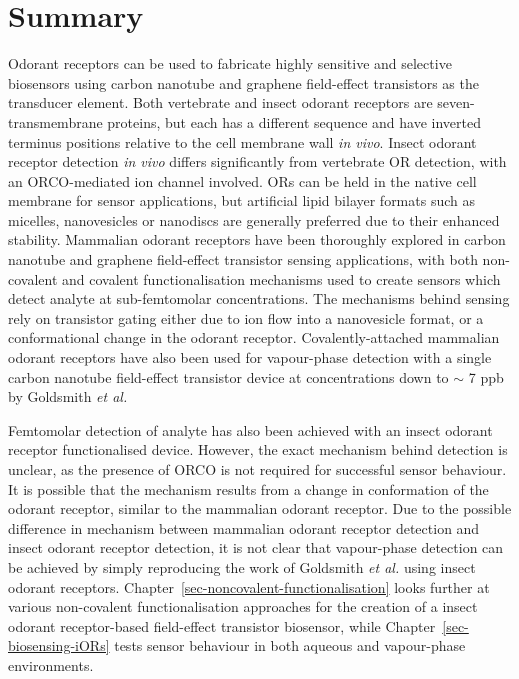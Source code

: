\documentclass[
  a4paper,
]{scrbook}
\begin{document}
\hypertarget{summary-1}{%
\section{Summary}\label{summary-1}}

Odorant receptors can be used to fabricate highly sensitive and
selective biosensors using carbon nanotube and graphene field-effect
transistors as the transducer element. Both vertebrate and insect
odorant receptors are seven-transmembrane proteins, but each has a
different sequence and have inverted terminus positions relative to the
cell membrane wall \emph{in vivo}. Insect odorant receptor detection
\emph{in vivo} differs significantly from vertebrate OR detection, with
an ORCO-mediated ion channel involved. ORs can be held in the native
cell membrane for sensor applications, but artificial lipid bilayer
formats such as micelles, nanovesicles or nanodiscs are generally
preferred due to their enhanced stability. Mammalian odorant receptors
have been thoroughly explored in carbon nanotube and graphene
field-effect transistor sensing applications, with both non-covalent and
covalent functionalisation mechanisms used to create sensors which
detect analyte at sub-femtomolar concentrations. The mechanisms behind
sensing rely on transistor gating either due to ion flow into a
nanovesicle format, or a conformational change in the odorant receptor.
Covalently-attached mammalian odorant receptors have also been used for
vapour-phase detection with a single carbon nanotube field-effect
transistor device at concentrations down to \(\sim\) 7 ppb by Goldsmith
\emph{et al.}

Femtomolar detection of analyte has also been achieved with an insect
odorant receptor functionalised device. However, the exact mechanism
behind detection is unclear, as the presence of ORCO is not required for
successful sensor behaviour. It is possible that the mechanism results
from a change in conformation of the odorant receptor, similar to the
mammalian odorant receptor. Due to the possible difference in mechanism
between mammalian odorant receptor detection and insect odorant receptor
detection, it is not clear that vapour-phase detection can be achieved
by simply reproducing the work of Goldsmith \emph{et al.} using insect
odorant receptors. Chapter~\ref{sec-noncovalent-functionalisation} looks
further at various non-covalent functionalisation approaches for the
creation of a insect odorant receptor-based field-effect transistor
biosensor, while Chapter~\ref{sec-biosensing-iORs} tests sensor
behaviour in both aqueous and vapour-phase environments.
\end{document}
